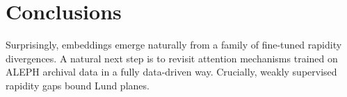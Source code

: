 \section{Conclusions}\label{sec:conclusions}

Surprisingly, embeddings emerge naturally from a family of fine-tuned
rapidity divergences. A natural next step is to revisit attention
mechanisms trained on ALEPH archival data in a fully data-driven way.
Crucially, weakly supervised rapidity gaps bound Lund planes.

